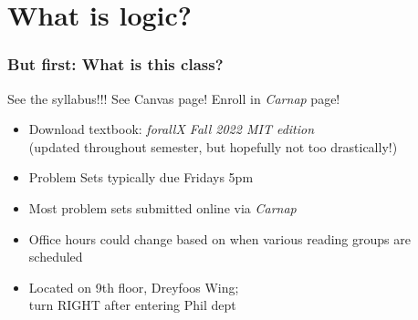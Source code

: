 ﻿%






\setcounter{section}{-1} %


\section{What is logic?}



\begin{frame}
  \frametitle{But first: What is this class?}
  
  See the syllabus!!! See Canvas page! Enroll in \emph{Carnap} page!
  
    \begin{itemize}[<+->] 
        \item Download textbook: \textit{forallX Fall 2022 MIT edition} \\ (updated throughout semester, but hopefully not too drastically!)
    \item Problem Sets typically due Fridays 5pm
   \item Most problem sets submitted online via \emph{Carnap}
    \item Office hours could change based on when various reading groups are scheduled
    \item Located on 9th floor, Dreyfoos Wing; \\ turn RIGHT after entering Phil dept
    
  \end{itemize}

  
  \end{frame}

